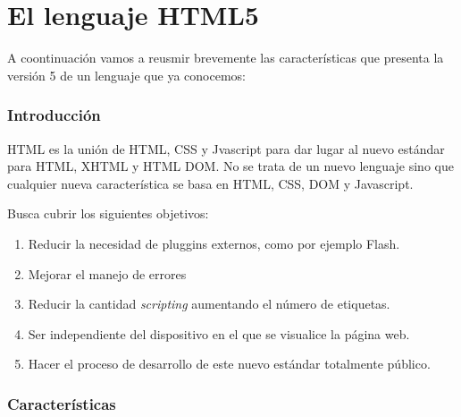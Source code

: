 \documentclass{apuntes}
\begin{document}
\section{El lenguaje HTML5}
A coontinuación vamos a reusmir brevemente las características que presenta la versión 5 de un lenguaje que ya conocemos:

\subsubsection{Introducción}
 HTML es la unión de HTML, CSS y Jvascript para dar lugar al nuevo estándar para HTML, XHTML y HTML DOM.
No se trata de un nuevo lenguaje sino que cualquier nueva característica se basa en HTML, CSS, DOM y Javascript.

Busca cubrir los siguientes objetivos:
\begin{enumerate}
\item Reducir la necesidad de pluggins externos, como por ejemplo Flash.
\item Mejorar el manejo de errores
\item Reducir la cantidad \emph{scripting} aumentando el número de etiquetas.
\item Ser independiente del dispositivo en el que se visualice la página web.
\item Hacer el proceso de desarrollo de este nuevo estándar totalmente público.
\end{enumerate}

\subsubsection{Características}
\end{document}
